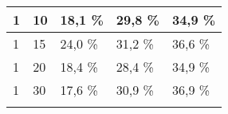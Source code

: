 \begin{table}[!htb]
\begin{tabular}{lllll}
\multicolumn{1}{|l|}{1}                                                      & \multicolumn{1}{l|}{10}                                                                & \multicolumn{1}{l|}{18,1 \%}                                                                                           & \multicolumn{1}{l|}{29,8 \%}                                                                                            & \multicolumn{1}{l|}{34,9 \%}                                                                                            \\ \hline
\multicolumn{1}{|l|}{1}                                                      & \multicolumn{1}{l|}{15}                                                                & \multicolumn{1}{l|}{24,0 \%}                                                                                           & \multicolumn{1}{l|}{31,2 \%}                                                                                            & \multicolumn{1}{l|}{36,6 \%}                                                                                            \\ \hline
\multicolumn{1}{|l|}{1}                                                      & \multicolumn{1}{l|}{20}                                                                & \multicolumn{1}{l|}{18,4 \%}                                                                                           & \multicolumn{1}{l|}{28,4 \%}                                                                                            & \multicolumn{1}{l|}{34,9 \%}                                                                                            \\ \hline
\multicolumn{1}{|l|}{1}                                                      & \multicolumn{1}{l|}{30}                                                                & \multicolumn{1}{l|}{17,6 \%}                                                                                           & \multicolumn{1}{l|}{30,9 \%}                                                                                            & \multicolumn{1}{l|}{36,9 \%}                                                                                            \\ \hline
                                                                             &                                                                                        &                                                                                                                       &                                                                                                                        &                                                                                                                        \\ \hline

\end{tabular}
\end{table}
